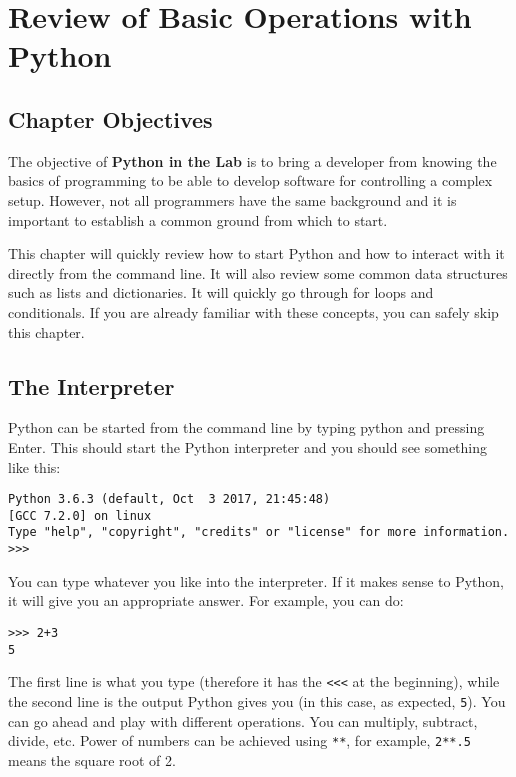 \chapter{Review of Basic Operations with Python}\label{review-of-basic-operations-withpython}

\section{Chapter Objectives}\label{chapterobjectives}

The objective of \textbf{Python in the Lab} is to bring a developer from
knowing the basics of programming to be able to develop software for
controlling a complex setup. However, not all programmers have the same
background and it is important to establish a common ground from which
to start.

This chapter will quickly review how to start Python and how to interact
with it directly from the command line. It will also review some common
data structures such as lists and dictionaries. It will quickly go
through for loops and conditionals. If you are already familiar with
these concepts, you can safely skip this chapter.

\section{The Interpreter}\label{theinterpreter}
Python can be started from the command line by typing python and
pressing Enter. This should start the Python interpreter and you should
see something like this:

\begin{verbatim}
Python 3.6.3 (default, Oct  3 2017, 21:45:48)
[GCC 7.2.0] on linux
Type "help", "copyright", "credits" or "license" for more information.
>>>
\end{verbatim}

You can type whatever you like into the interpreter. If it makes sense
to Python, it will give you an appropriate answer. For example, you
can do:

\begin{verbatim}
>>> 2+3
5
\end{verbatim}

The first line is what you type (therefore it has the
\texttt{<<<} at the beginning),
while the second line is the output Python gives you (in this case, as
expected, \texttt{5}). You can go ahead and play with different
operations. You can multiply, subtract, divide, etc. Power of numbers
can be achieved using \texttt{**}, for example, \texttt{2**.5} means the
square root of 2.

